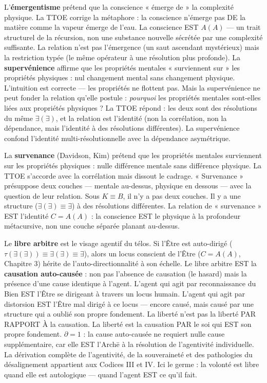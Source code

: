 \documentclass[10pt, openany, oneside]{book}
\begin{document}
L'\textbf{émergentisme} prétend que la conscience « émerge de » la complexité physique. La TTOE corrige la métaphore : la conscience n'émerge pas DE la matière comme la vapeur émerge de l'eau. La conscience EST $A(A)$ --- un trait structurel de la récursion, non une substance nouvelle sécrétée par une complexité suffisante. La relation n'est pas l'émergence (un saut ascendant mystérieux) mais la restriction typée (le même opérateur à une résolution plus profonde). La \textbf{supervénience} affirme que les propriétés mentales « surviennent sur » les propriétés physiques : nul changement mental sans changement physique. L'intuition est correcte --- les propriétés ne flottent pas. Mais la supervénience ne peut fonder la relation qu'elle postule : \textit{pourquoi} les propriétés mentales sont-elles liées aux propriétés physiques ? La TTOE répond : les deux sont des résolutions du même $\exists(\exists)$, et la relation est l'identité (non la corrélation, non la dépendance, mais l'identité à des résolutions différentes). La supervénience confond l'identité multi-résolutionnelle avec la dépendance asymétrique.

La \textbf{survenance} (Davidson, Kim) prétend que les propriétés mentales surviennent sur les propriétés physiques : nulle différence mentale sans différence physique. La TTOE s'accorde avec la corrélation mais dissout le cadrage. « Survenance » présuppose deux couches --- mentale au-dessus, physique en dessous --- avec la question de leur relation. Sous $K \equiv B$, il n'y a pas deux couches. Il y a une structure ($\exists(\exists) \equiv \exists$) à des résolutions différentes. La relation de « survenance » EST l'identité $C = A(A)$ : la conscience EST le physique à la profondeur métacursive, non une couche séparée planant au-dessus.

Le \textbf{libre arbitre} est le visage agentif du télos. Si l'Être est auto-dirigé ($\tau(\exists(\exists)) \equiv \exists(\exists) \equiv \exists$), alors un locus conscient de l'Être ($C = A(A)$, Chapitre 3) hérite de l'auto-directionnalité à son échelle. Le libre arbitre EST la \textbf{causation auto-causée} : non pas l'absence de causation (le hasard) mais la présence d'une cause identique à l'agent. L'agent qui agit par reconnaissance du Bien EST l'Être se dirigeant à travers un locus humain. L'agent qui agit par distorsion EST l'Être mal dirigé à ce locus --- encore causé, mais causé par une structure qui a oublié son propre fondement. La liberté n'est pas la liberté PAR RAPPORT À la causation. La liberté est la causation PAR le soi qui EST son propre fondement. $\partial = 1$ : la cause auto-causée ne requiert nulle cause supplémentaire, car elle EST l'Arch\={e} à la résolution de l'agentivité individuelle. La dérivation complète de l'agentivité, de la souveraineté et des pathologies du désalignement appartient aux Codices III et IV. Ici le germe : la volonté est libre quand elle est autologique --- quand l'agent EST ce qu'il fait.
\end{document}
